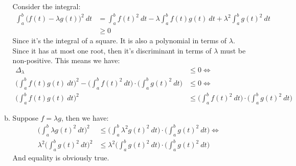 \documentclass[letterpaper,10pt]{article}
\begin{document}
\begin{enumerate}
\begin{enumerate}[a)]

		Consider the integral:
		\begin{align*}
		  \int_{a}^{b} \big( f(t) - \lambda g(t) \big)^2 \ dt &= \int_{a}^{b} f(t)^2\ dt - \lambda \int_{a}^{b} f(t)g(t)\ dt + \lambda^2 \int_{a}^{b} g(t)^2 \ dt\\
		  & \geq 0
		\end{align*}
		Since it's the integral of a square. It is also a polynomial in terms of $\lambda$. Since it has at most one root, then it's discriminant in terms of $\lambda$ must be non-positive. This means we have:
		\begin{align*}
			\Delta_{\lambda} & \leq 0 \iff \\
		  \Bigg( \int_{a}^{b} f(t)g(t)\ dt \Bigg)^2 - \Bigg( \int_{a}^{b} f(t)^2\ dt \Bigg) \cdot \Bigg( \int_{a}^{b} g(t)^2 \ dt \Bigg) & \leq 0 \iff \\
		  \Bigg( \int_{a}^{b} f(t)g(t)\ dt \Bigg)^2 & \leq \Bigg( \int_{a}^{b} f(t)^2\ dt \Bigg) \cdot \Bigg( \int_{a}^{b} g(t)^2 \ dt \Bigg) 
		\end{align*}
		\item Suppose $f = \lambda g$, then we have:
		\begin{align*}
		  \Bigg( \int_{a}^{b} \lambda g(t)^2\ dt \Bigg)^2 & \leq \Bigg( \int_{a}^{b} \lambda^2 g(t)^2\ dt \Bigg) \cdot \Bigg( \int_{a}^{b} g(t)^2 \ dt \Bigg) \iff \\
		  \lambda^2 \Bigg( \int_{a}^{b} g(t)^2\ dt \Bigg)^2 & \leq \lambda^2 \Bigg( \int_{a}^{b} g(t)^2\ dt \Bigg) \cdot \Bigg( \int_{a}^{b} g(t)^2 \ dt \Bigg)
		\end{align*}
		And equality is obviously true.


\end{enumerate}
\end{enumerate}
\end{document}
